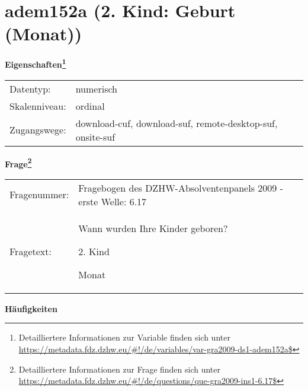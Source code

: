 
    \setcounter{footnote}{0}

    \vspace*{-1.8cm}
	\section{adem152a (2. Kind: Geburt (Monat))}
	\label{section:adem152a}



    \vspace*{0.5cm}
    \noindent\textbf{Eigenschaften\footnote{Detailliertere Informationen zur Variable finden sich unter
		\url{https://metadata.fdz.dzhw.eu/\#!/de/variables/var-gra2009-ds1-adem152a$}}}\\
	\begin{tabularx}{\hsize}{@{}lX}
	Datentyp: & numerisch \\
	Skalenniveau: & ordinal \\
	Zugangswege: &
	  download-cuf, 
	  download-suf, 
	  remote-desktop-suf, 
	  onsite-suf
 \\
    \end{tabularx}



				\vspace*{0.5cm}
                \noindent\textbf{Frage\footnote{Detailliertere Informationen zur Frage finden sich unter
		              \url{https://metadata.fdz.dzhw.eu/\#!/de/questions/que-gra2009-ins1-6.17$}}}\\
				\begin{tabularx}{\hsize}{@{}lX}
					Fragenummer: &
					  Fragebogen des DZHW-Absolventenpanels 2009 - erste Welle:
					  6.17
 \\
					Fragetext: & Wann wurden Ihre Kinder geboren?\par  2. Kind\par  Monat \\
				\end{tabularx}





        		\vspace*{0.5cm}
                \noindent\textbf{Häufigkeiten}

